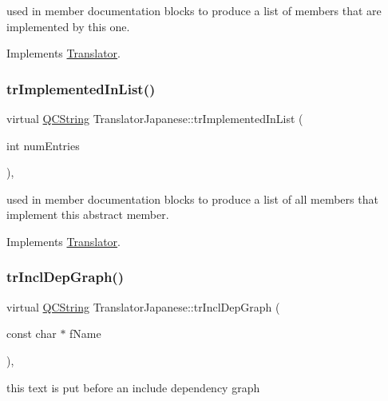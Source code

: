 used in member documentation blocks to produce a list of members that are implemented by this one. 

Implements \mbox{\hyperlink{class_translator}{Translator}}.

\mbox{\label{class_translator_japanese_ad9c3549fb27b3a61b1ab51f9d424beb3}} 
\subsubsection{\texorpdfstring{trImplementedInList()}{trImplementedInList()}}
{\footnotesize\ttfamily virtual \mbox{\hyperlink{class_q_c_string}{Q\+C\+String}} Translator\+Japanese\+::tr\+Implemented\+In\+List (\begin{DoxyParamCaption}\item[{int}]{num\+Entries }\end{DoxyParamCaption})\hspace{0.3cm}{\ttfamily [inline]}, {\ttfamily [virtual]}}

used in member documentation blocks to produce a list of all members that implement this abstract member. 

Implements \mbox{\hyperlink{class_translator}{Translator}}.

\mbox{\label{class_translator_japanese_afd8ab3f0b6b1abdfd6af112f31ec4354}} 
\subsubsection{\texorpdfstring{trInclDepGraph()}{trInclDepGraph()}}
{\footnotesize\ttfamily virtual \mbox{\hyperlink{class_q_c_string}{Q\+C\+String}} Translator\+Japanese\+::tr\+Incl\+Dep\+Graph (\begin{DoxyParamCaption}\item[{const char $\ast$}]{f\+Name }\end{DoxyParamCaption})\hspace{0.3cm}{\ttfamily [inline]}, {\ttfamily [virtual]}}

this text is put before an include dependency graph 

